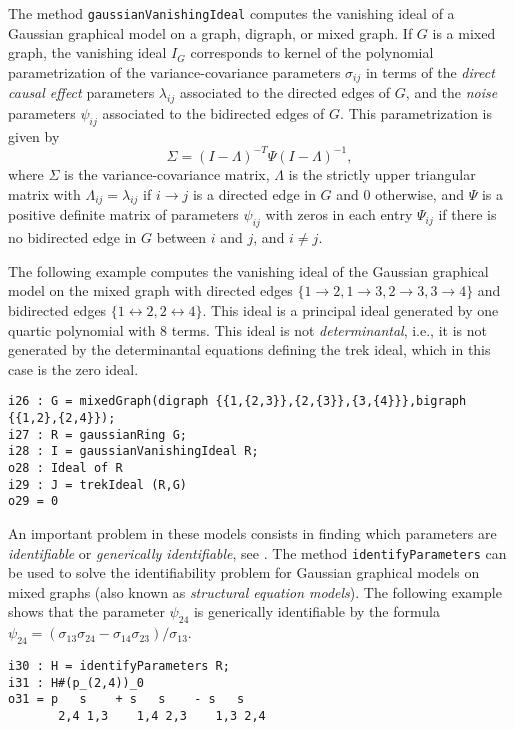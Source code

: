 \documentclass[letterpaper]{article}
\theoremstyle{plain}
\theoremstyle{definition}
\begin{document}
The method {\tt gaussianVanishingIdeal} computes the vanishing ideal of a
Gaussian graphical model on a graph, digraph, or mixed graph. If $G$ is a mixed
graph, 
the vanishing ideal $I_{G}$ corresponds to kernel of the polynomial parametrization of the
variance-covariance parameters  $\sigma_{ij}$ in terms of the \emph{direct
  causal effect} parameters $\lambda_{ij}$ associated to the directed edges of $G$,   
and the \emph{noise} parameters $\psi_{ij}$ associated to the
bidirected edges of $G$. This parametrization is  given by
\[\Sigma = (I - \Lambda)^{-T}\Psi(I-\Lambda)^{-1},\] 
where $\Sigma$ is the variance-covariance matrix, $\Lambda$ is the strictly
upper triangular matrix with $\Lambda_{ij} = \lambda_{ij}$ if $i\to j$ is a
directed edge in $G$ and 0 otherwise, and $\Psi$ is a positive definite
matrix of parameters $\psi_{ij}$ with zeros in each entry $\Psi_{ij}$ if there is no
bidirected edge in $G$ between $i$ and $j$, and $i\neq j$.

The following example computes the vanishing ideal of the Gaussian graphical
model  on the mixed graph with directed edges
$\{1\to 2, 1\to 3, 2\to 3, 3\to 4\}$ and bidirected edges $\{1 \leftrightarrow 2, 2 \leftrightarrow
4\}$. This ideal is a principal ideal generated by one quartic polynomial with 8
terms. This ideal is not \emph{determinantal}, i.e., it is not generated by the
determinantal equations defining 
the trek ideal, which in this case is the zero ideal.


\begin{verbatim}
i26 : G = mixedGraph(digraph {{1,{2,3}},{2,{3}},{3,{4}}},bigraph {{1,2},{2,4}});
i27 : R = gaussianRing G;
i28 : I = gaussianVanishingIdeal R;
o28 : Ideal of R
i29 : J = trekIdeal (R,G)
o29 = 0
\end{verbatim}

An important problem in these models consists in finding which parameters are
\emph{identifiable} or \emph{generically identifiable}, see \cite{GPSS}. The method
\texttt{identifyParameters} can be used to solve the identifiability problem for
Gaussian graphical  models on mixed graphs (also known as \emph{structural
  equation models}). The following example shows that the parameter
$\psi_{24}$ is generically identifiable by the formula $\psi_{24} =
(\sigma_{13}\sigma_{24} - \sigma_{14}\sigma_{23})/ \sigma_{13}$. 

\begin{verbatim}
i30 : H = identifyParameters R;
i31 : H#(p_(2,4))_0
o31 = p   s    + s   s    - s   s
       2,4 1,3    1,4 2,3    1,3 2,4
\end{verbatim}
\end{document}
